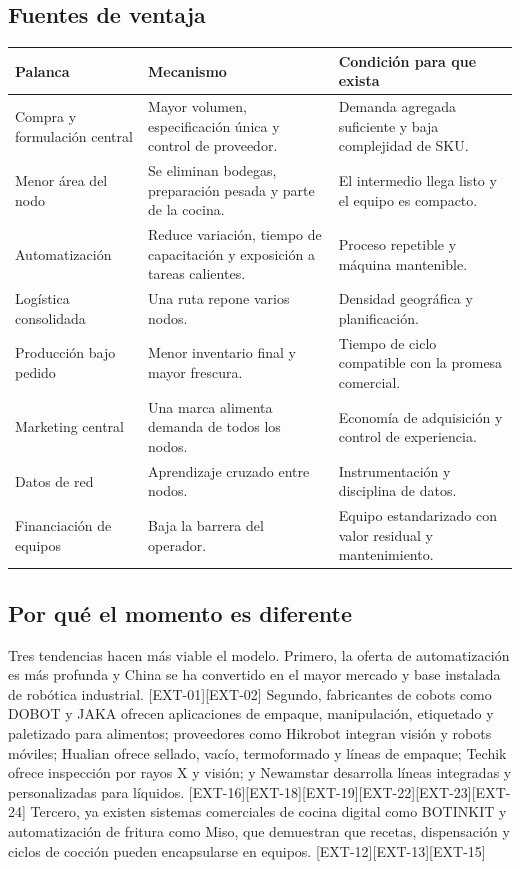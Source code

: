 \documentclass[11pt,a4paper]{article}
\begin{document}
\subsection{Fuentes de ventaja}
{\small
\begin{xltabular}{\textwidth}{@{}P{3.4cm}LL@{}}
\toprule
\textbf{Palanca} & \textbf{Mecanismo} & \textbf{Condición para que exista}\\ \midrule
\endhead
Compra y formulación central & Mayor volumen, especificación única y control de proveedor. & Demanda agregada suficiente y baja complejidad de SKU.\\
Menor área del nodo & Se eliminan bodegas, preparación pesada y parte de la cocina. & El intermedio llega listo y el equipo es compacto.\\
Automatización & Reduce variación, tiempo de capacitación y exposición a tareas calientes. & Proceso repetible y máquina mantenible.\\
Logística consolidada & Una ruta repone varios nodos. & Densidad geográfica y planificación.\\
Producción bajo pedido & Menor inventario final y mayor frescura. & Tiempo de ciclo compatible con la promesa comercial.\\
Marketing central & Una marca alimenta demanda de todos los nodos. & Economía de adquisición y control de experiencia.\\
Datos de red & Aprendizaje cruzado entre nodos. & Instrumentación y disciplina de datos.\\
Financiación de equipos & Baja la barrera del operador. & Equipo estandarizado con valor residual y mantenimiento.\\
\bottomrule
\end{xltabular}}

\subsection{Por qué el momento es diferente}
Tres tendencias hacen más viable el modelo. Primero, la oferta de automatización es más profunda y China
se ha convertido en el mayor mercado y base instalada de robótica industrial. [EXT-01][EXT-02] Segundo,
fabricantes de cobots como DOBOT y JAKA ofrecen aplicaciones de empaque, manipulación, etiquetado y
paletizado para alimentos; proveedores como Hikrobot integran visión y robots móviles; Hualian ofrece
sellado, vacío, termoformado y líneas de empaque; Techik ofrece inspección por rayos X y visión; y
Newamstar desarrolla líneas integradas y personalizadas para líquidos.
[EXT-16][EXT-18][EXT-19][EXT-22][EXT-23][EXT-24] Tercero, ya existen sistemas comerciales de cocina
digital como BOTINKIT y automatización de fritura como Miso, que demuestran que recetas, dispensación y
ciclos de cocción pueden encapsularse en equipos. [EXT-12][EXT-13][EXT-15]
\end{document}
